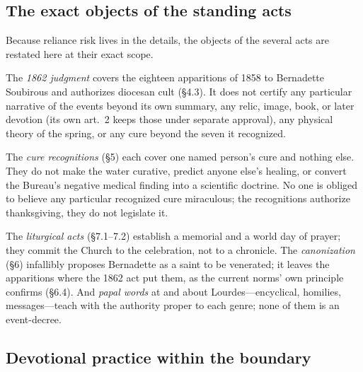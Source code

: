\subsection{The exact objects of the standing acts}

Because reliance risk lives in the details, the objects of the
several acts are restated here at their exact scope.

The \emph{1862 judgment} covers the eighteen apparitions of 1858
to Bernadette Soubirous and authorizes diocesan cult (\S4.3). It
does not certify any particular narrative of the events beyond
its own summary, any relic, image, book, or later devotion (its
own art.~2 keeps those under separate approval), any physical
theory of the spring, or any cure beyond the seven it recognized.

The \emph{cure recognitions} (\S5) each cover one named person's
cure and nothing else. They do not make the water curative,
predict anyone else's healing, or convert the Bureau's negative
medical finding into a scientific doctrine. No one is obliged to
believe any particular recognized cure miraculous; the
recognitions authorize thanksgiving, they do not legislate it.

The \emph{liturgical acts} (\S7.1--7.2) establish a memorial and
a world day of prayer; they commit the Church to the celebration,
not to a chronicle. The \emph{canonization} (\S6) infallibly
proposes Bernadette as a saint to be venerated; it leaves the
apparitions where the 1862 act put them, as the current norms'
own principle confirms (\S6.4). And \emph{papal words} at and
about Lourdes---encyclical, homilies, messages---teach with the
authority proper to each genre; none of them is an event-decree.

\subsection{Devotional practice within the boundary}

